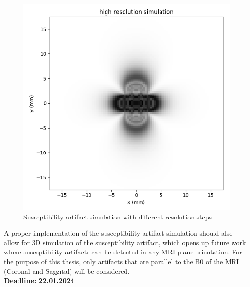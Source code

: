 \documentclass{article}
\begin{document}
\begin{figure}[h]
\begin{minipage}{0.3\textwidth}
    \end{minipage}\hfill
    \begin{minipage}{0.3\textwidth}
        \centering
        \includegraphics[width=\textwidth]{img/high-resolution-simulation.png}
    \end{minipage}\hfill
    \caption{Susceptibility artifact simulation with different resolution steps}
    \label{fig:sus-representation}
\end{figure}

A proper implementation of the susceptibility artifact simulation should also allow for 3D simulation of the susceptibility artifact, which opens up future work where susceptibility artifacts can be detected in any MRI plane orientation. For the purpose of this thesis, only artifacts that are parallel to the B0 of the MRI (Coronal and Saggital) will be considered.\\
\textbf{Deadline: 22.01.2024}
\end{document}
